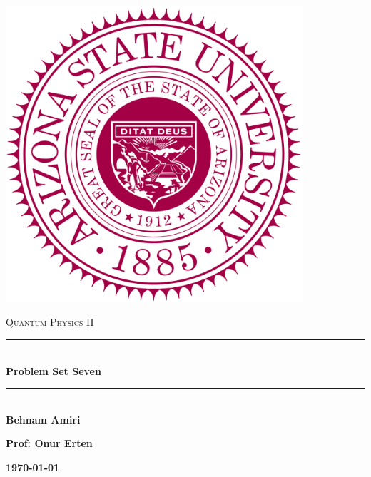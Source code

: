 \documentclass[fleqn]{article}
\begin{document}
  \begin{titlepage}

    \newcommand{\HRule}{\rule{\linewidth}{0.5mm}}

    \center

    \begin{center}
      \includegraphics[height=11cm, width=11cm]{asu.png}
    \end{center}

    \vline

    \textsc{\LARGE Quantum Physics II}\\[1.5cm]

    \HRule \\[0.5cm]
    { \huge \bfseries Problem Set Seven}\\[0.4cm] 
    \HRule \\[1.0cm]

    \textbf{Behnam Amiri}

    \bigbreak

    \textbf{Prof: Onur Erten}

    \bigbreak

    \textbf{{\large \today}\\[2cm]}

    \vfill

  \end{titlepage}
\end{document}
